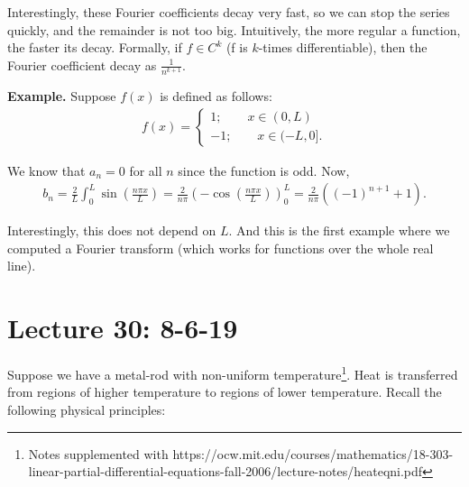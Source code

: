\documentclass{article}
\begin{document}
Interestingly, these Fourier coefficients decay very fast, so we can stop the series quickly, and the remainder is not too big.  Intuitively, the more regular a function, the faster its decay.  Formally, if $f \in C^k$ (f is $k$-times differentiable), then the Fourier coefficient decay as $\frac{1}{n^{k+1}}$.

{\bf Example.} Suppose $f(x)$ is defined as follows:
\begin{align*}
  f(x) = 
  \begin{cases} 
    1; \qquad x \in (0, L) \\
    -1; \qquad x \in (-L, 0].
  \end{cases}
\end{align*}

We know that $a_n = 0$ for all $n$ since the function is odd.  Now,
\begin{align*}
  b_n = \frac{2}{L} \int_{0}^{L} \sin \left( \frac{n \pi x}{L} \right) = \frac{2}{n\pi} \left( - \cos \left( \frac{n \pi x}{L} \right) \right)_{0}^{L} = \frac{2}{n \pi} \left( (-1)^{n+1} + 1 \right).
\end{align*}

Interestingly, this does not depend on $L$.  And this is the first example where we computed a Fourier transform (which works for functions over the whole real line).

\section{Lecture 30: 8-6-19}


Suppose we have a metal-rod with non-uniform temperature\footnote{Notes supplemented with https://ocw.mit.edu/courses/mathematics/18-303-linear-partial-differential-equations-fall-2006/lecture-notes/heateqni.pdf}.  Heat is transferred from regions of higher temperature to regions of lower temperature.  Recall the following physical principles:
\end{document}
